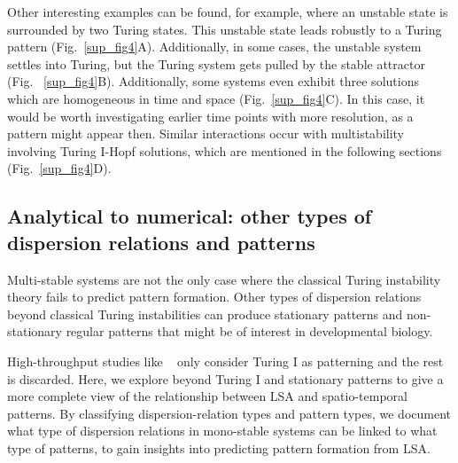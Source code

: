 Other interesting examples can be found, for example, where an unstable state is surrounded by two Turing states. This unstable state leads robustly to a Turing pattern (Fig.~\ref{sup_fig4}A).
Additionally, in some cases, the unstable system settles into Turing, but the Turing system gets pulled by the stable attractor (Fig. ~\ref{sup_fig4}B). Additionally, some systems even exhibit three solutions which are homogeneous in time and space (Fig.~\ref{sup_fig4}C). In this case, it would be worth investigating earlier time points with more resolution, as a pattern might appear then.
Similar interactions occur with multistability involving Turing I-Hopf solutions, which are mentioned in the following sections (Fig.~\ref{sup_fig4}D).


\subsection{Analytical to numerical: other types of dispersion relations and patterns} \label{nogrowth}

Multi-stable systems are not the only case where the classical Turing instability theory fails to predict pattern formation.
Other types of dispersion relations beyond classical Turing instabilities can produce stationary patterns and non-stationary regular patterns that might be of interest in developmental biology.

High-throughput studies like ~\cite{Scholes2019, Zheng2016, Marcon} only consider Turing I as patterning and the rest is discarded.
Here, we explore beyond Turing I and stationary patterns to give a more complete view of the relationship between LSA and spatio-temporal patterns. By classifying dispersion-relation types and pattern types, we document what type of dispersion relations in mono-stable systems can be linked to what type of patterns, to gain insights into predicting pattern formation from LSA.

